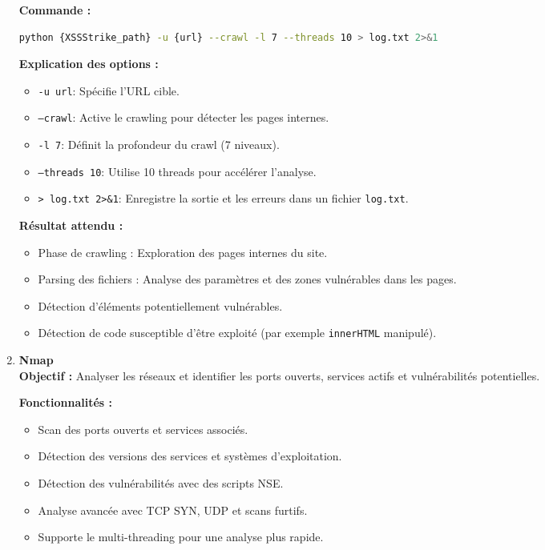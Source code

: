 \begin{justify}
\begin{enumerate}[left=0cm]
            \textbf{Commande :}
            \begin{lstlisting}[language=bash]
            python {XSSStrike_path} -u {url} --crawl -l 7 --threads 10 > log.txt 2>&1
            \end{lstlisting}
            
            \textbf{Explication des options :}
            \begin{itemize}[label=$\bullet$]
                \item \texttt{-u {url}}: Spécifie l'URL cible.
                \item \texttt{--crawl}: Active le crawling pour détecter les pages internes.
                \item \texttt{-l 7}: Définit la profondeur du crawl (7 niveaux).
                \item \texttt{--threads 10}: Utilise 10 threads pour accélérer l’analyse.
                \item \texttt{> log.txt 2>\&1}: Enregistre la sortie et les erreurs dans un fichier \texttt{log.txt}.
            \end{itemize}
            
            \textbf{Résultat attendu :}
            \begin{itemize}[label=$\bullet$]
                \item Phase de crawling : Exploration des pages internes du site.
                \item Parsing des fichiers : Analyse des paramètres et des zones vulnérables dans les pages.
                \item Détection d’éléments potentiellement vulnérables.
                \item Détection de code susceptible d’être exploité (par exemple \texttt{innerHTML} manipulé).
            \end{itemize}
    \item \textbf{Nmap} \\
        \textbf{Objectif :} Analyser les réseaux et identifier les ports ouverts, services actifs et vulnérabilités potentielles.
        
        \textbf{Fonctionnalités :}
        \begin{itemize}[label=$\bullet$]
            \item Scan des ports ouverts et services associés.
            \item Détection des versions des services et systèmes d’exploitation.
            \item Détection des vulnérabilités avec des scripts NSE.
            \item Analyse avancée avec TCP SYN, UDP et scans furtifs.
            \item Supporte le multi-threading pour une analyse plus rapide.
        \end{itemize}
        

\end{enumerate}
\end{justify}
